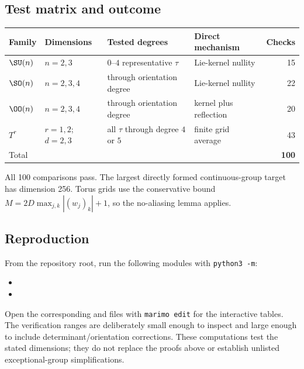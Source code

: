 \documentclass[10pt]{article}
\begin{document}
\subsection{Test matrix and outcome}
\begin{center}
\begin{tabular}{@{}llllr@{}}
\toprule
Family & Dimensions & Tested degrees & Direct mechanism & Checks\\
\midrule
$\SU(n)$ & $n=2,3$ & $0$--$4$ representative $\tau$ & Lie-kernel nullity & 15\\
$\SO(n)$ & $n=2,3,4$ & through orientation degree & Lie-kernel nullity & 22\\
$\OO(n)$ & $n=2,3,4$ & through orientation degree & kernel plus reflection & 20\\
$T^r$ & $r=1,2$; $d=2,3$ & all $\tau$ through degree $4$ or $5$ & finite grid average & 43\\
\midrule
Total & & & & \textbf{100}\\
\bottomrule
\end{tabular}
\end{center}
All 100 comparisons pass.  The largest directly formed continuous-group
target has dimension 256.  Torus grids use the conservative bound
$M=2D\max_{j,k}|(w_j)_k|+1$, so the no-aliasing lemma applies.

\subsection{Reproduction}
From the repository root, run the following modules with \texttt{python3 -m}:
\begin{itemize}
\small
\item {}
\item {}
\end{itemize}
Open the corresponding  and
 files with \texttt{marimo edit} for the interactive
tables.
The verification ranges are deliberately small enough to inspect and large
enough to include determinant/orientation corrections.  These computations
test the stated dimensions; they do not replace the proofs above or establish
unlisted exceptional-group simplifications.
\endgroup


\clearpage
\end{document}
